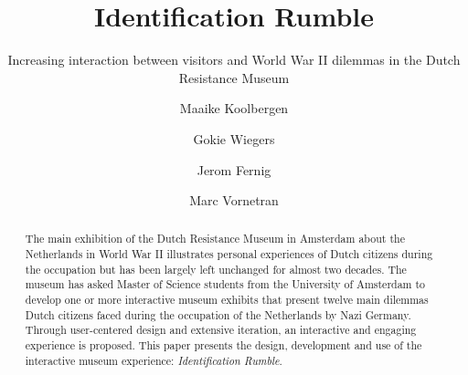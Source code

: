 \documentclass[sigconf]{acmart}
\begin{document}
\title{Identification Rumble}
\subtitle{Increasing interaction between visitors and World War II dilemmas in the Dutch Resistance Museum}

\author{Maaike Koolbergen}

\author{Gokie Wiegers}

\author{Jerom Fernig}

\author{Marc Vornetran}


\begin{abstract}
The main exhibition of the Dutch Resistance Museum in Amsterdam about the Netherlands in World War II illustrates personal experiences of Dutch citizens during the occupation but has been largely left unchanged for almost two decades. The museum has asked Master of Science students from the University of Amsterdam to develop one or more interactive museum exhibits that present twelve main dilemmas Dutch citizens faced during the occupation of the Netherlands by Nazi Germany. Through user-centered design and extensive iteration, an interactive and engaging experience is proposed. This paper presents the design, development and use of the interactive museum experience: \textit{Identification Rumble}. 
\end{abstract}


\maketitle




\end{document}
